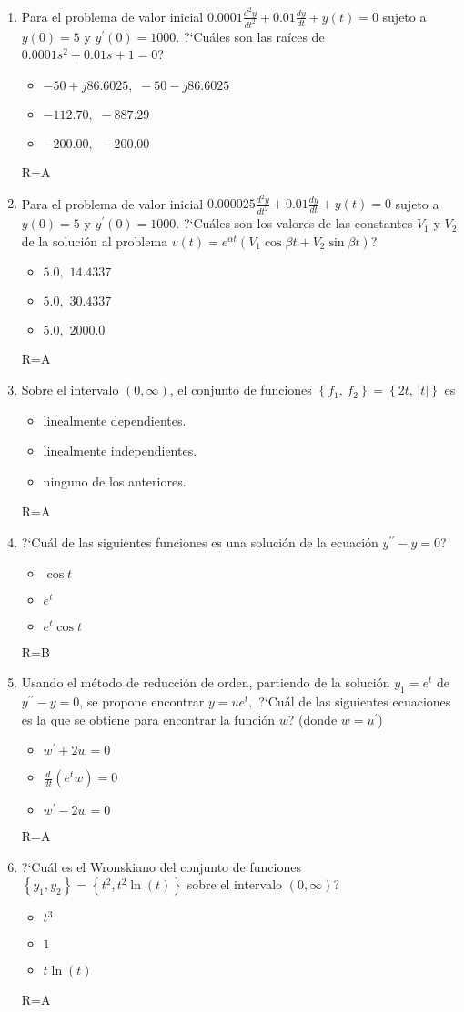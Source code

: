 \documentclass[12pt]{article}
\def\TresOp#1#2#3{
\begin{itemize}
\item[A)] #1
\item[B)] #2
\item[C)] #3
\end{itemize}
}
\begin{document}
\begin{enumerate}
{$5.0,\,\,300.0$}
{$5.0,\,\,2000.0$}
{\tiny R=C}
\item Para el problema de valor inicial $0.0001\frac{d^{2}y}{dt^{2}}+0.01\frac{dy}{dt}+y(t)=0$ 
sujeto a $y(0)=5$ y $y^{\prime}(0)=1000$. ?`Cuáles son las raíces de $0.0001s^{2}+0.01s+1=0$?
\TresOp{$-50+j86.6025,\,\,-50-j86.6025$}
{$-112.70,\,\,-887.29$}
{$-200.00,\,\,-200.00$}
{\tiny R=A}
\newpage
\item Para el problema de valor inicial $0.000025\frac{d^{2}y}{dt^{2}}+0.01\frac{dy}{dt}+y(t)=0$ 
sujeto a $y(0)=5$ y $y^{\prime}(0)=1000$. ?`Cuáles son los valores de las constantes 
$V_{1}$ y $V_{2}$ de la solución al problema $v(t)=e^{\alpha t}(V_{1}\cos\beta t+V_{2}\sin\beta t)$?
\TresOp{$5.0,\,\,14.4337$}
{$5.0,\,\,30.4337$}
{$5.0,\,\,2000.0$}
{\tiny R=A}
\item Sobre el intervalo $(0,\infty)$, el conjunto de funciones 
$\left\{f_{1},\,f_{2}\right\}=\left\{2t,\,\left|t\right|\right\}$ es
\TresOp{linealmente dependientes.}
{linealmente independientes.}
{ninguno de los anteriores.}
{\tiny R=A}
\item ?`Cuál de las siguientes funciones es una solución de la ecuación $y^{\prime\prime}-y=0$?
\TresOp{$\cos t$}
{$e^{t}$}
{$e^{t}\cos t$}
{\tiny R=B}
\item Usando el método de reducción de orden, partiendo de la solución $y_{1}=e^{t}$ de 
$y^{\prime\prime}-y=0$, se propone encontrar $y=ue^{t}, $ ?`Cuál de las siguientes ecuaciones es la que se obtiene para encontrar la función $w$? (donde $w=u^{\prime}$) 
\TresOp{$w^{\prime}+2w=0$}
{$\frac{d}{dt}(e^{t}w)=0$}
{$w^{\prime}-2w=0$}
{\tiny R=A}
\item ?`Cuál es el Wronskiano del conjunto de funciones 
$\left\{y_{1},y_{2}\right\}=\left\{t^{2},t^{2}\ln(t)\right\}$ sobre el intervalo $(0,\infty)$?
\TresOp{$t^{3}$}
{$1$}
{$t\ln(t)$}
{\tiny R=A}
\end{enumerate}
\end{document}
